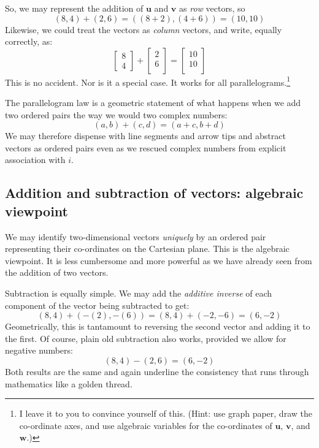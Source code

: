 \documentclass[
  a4paper,
]{article}
\begin{document}
So, we may represent the addition of \(\symbf{u}\) and \(\symbf{v}\) as
\emph{row} vectors, so \[
(8, 4) + (2, 6) = ((8+2), (4+6)) = (10, 10)
\] Likewise, we could treat the vectors as \emph{column} vectors, and
write, equally correctly, as: \[
\begin{bmatrix}8\\4\end{bmatrix}
+
\begin{bmatrix}2\\6\\\end{bmatrix}
=
\begin{bmatrix}10\\10\\\end{bmatrix}
\] This is no accident. Nor is it a special case. It works for all
parallelograms.\footnote{I leave it to you to convince yourself of this.
  (Hint: use graph paper, draw the co-ordinate axes, and use algebraic
  variables for the co-ordinates of \(\symbf{u}\), \(\symbf{v}\), and
  \(\symbf{w}\).)}

The parallelogram law is a geometric statement of what happens when we
add two ordered pairs the way we would two complex numbers: \[
(a, b) + (c, d) = (a+c, b+d)
\] We may therefore dispense with line segments and arrow tips and
abstract vectors as ordered pairs even as we rescued complex numbers
from explicit association with \(i\).

\hypertarget{addition-and-subtraction-of-vectors-algebraic-viewpoint}{%
\subsection{Addition and subtraction of vectors: algebraic
viewpoint}\label{addition-and-subtraction-of-vectors-algebraic-viewpoint}}

We may identify two-dimensional vectors \emph{uniquely} by an ordered
pair representing their co-ordinates on the Cartesian plane. This is the
algebraic viewpoint. It is less cumbersome and more powerful as we have
already seen from the addition of two vectors.

Subtraction is equally simple. We may add the \emph{additive inverse} of
each component of the vector being subtracted to get: \[
(8, 4) + (-(2), -(6)) = (8, 4) + (-2, -6) = (6, -2)
\] Geometrically, this is tantamount to reversing the second vector and
adding it to the first. Of course, plain old subtraction also works,
provided we allow for negative numbers: \[
(8, 4) - (2, 6) = (6, -2)
\] Both results are the same and again underline the consistency that
runs through mathematics like a golden thread. 
\normalfont
\end{document}
